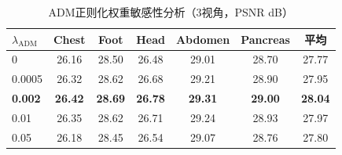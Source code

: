 \begin{table}[htbp]
    \centering
    \caption{ADM正则化权重敏感性分析（3视角，PSNR dB）}
    \label{tab:spags_adm_hyper}
    \begin{tabular}{lcccccc}
        \toprule
        $\lambda_{\text{ADM}}$ & Chest & Foot & Head & Abdomen & Pancreas & 平均 \\
        \midrule
        0 & 26.16 & 28.50 & 26.48 & 29.01 & 28.70 & 27.77 \\
        0.0005 & 26.32 & 28.62 & 26.68 & 29.21 & 28.90 & 27.95 \\
        \textbf{0.002} & \textbf{26.42} & \textbf{28.69} & \textbf{26.78} & \textbf{29.31} & \textbf{29.00} & \textbf{28.04} \\
        0.01 & 26.35 & 28.62 & 26.71 & 29.24 & 28.93 & 27.97 \\
        0.05 & 26.18 & 28.45 & 26.54 & 29.07 & 28.76 & 27.80 \\
        \bottomrule
    \end{tabular}
\end{table}
